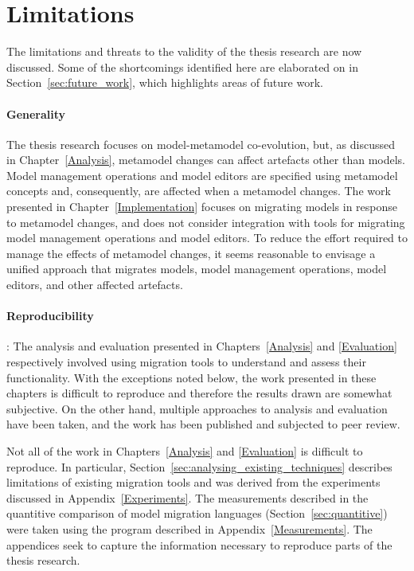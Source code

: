 
\section{Limitations}
The limitations and threats to the validity of the thesis research are now discussed. Some of the shortcomings identified here are elaborated on in Section~\ref{sec:future_work}, which highlights areas of future work.

\paragraph{Generality} The thesis research focuses on model-metamodel co-evolution, but, as discussed in Chapter~\ref{Analysis}, metamodel changes can affect artefacts other than models. Model management operations and model editors are specified using metamodel concepts and, consequently, are affected when a metamodel changes. The work presented in Chapter~\ref{Implementation} focuses on migrating models in response to metamodel changes, and does not consider integration with tools for migrating model management operations and model editors. To reduce the effort required to manage the effects of metamodel changes, it seems reasonable to envisage a unified approach that migrates models, model management operations, model editors, and other affected artefacts.

\paragraph{Reproducibility}: The analysis and evaluation presented in Chapters~\ref{Analysis} and \ref{Evaluation} respectively involved using migration tools to understand and assess their functionality. With the exceptions noted below, the work presented in these chapters is difficult to reproduce and therefore the results drawn are somewhat subjective. On the other hand, multiple approaches to analysis and evaluation have been taken, and the work has been published and subjected to peer review. 

Not all of the work in Chapters~\ref{Analysis} and \ref{Evaluation} is difficult to reproduce. In particular, Section~\ref{sec:analysing_existing_techniques} describes limitations of existing migration tools and was derived from the experiments discussed in Appendix~\ref{Experiments}. The measurements described in the quantitive comparison of model migration languages (Section~\ref{sec:quantitive}) were taken using the program described in Appendix~\ref{Measurements}. The appendices seek to capture the information necessary to reproduce parts of the thesis research.

